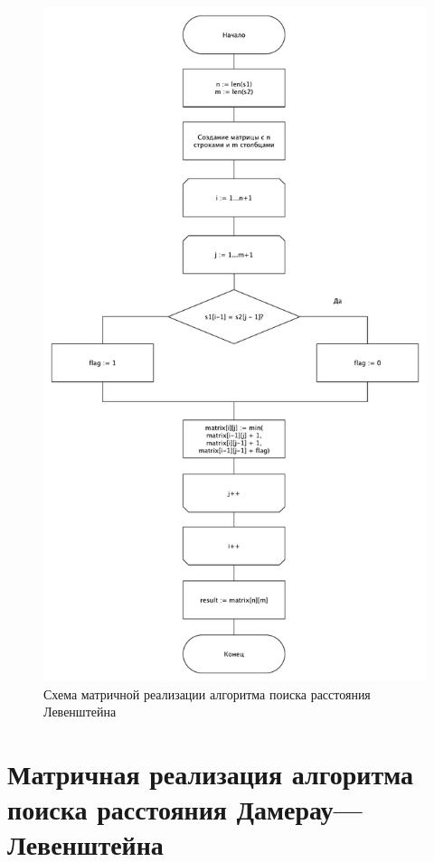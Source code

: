 \begin{figure}[H]
	\centering
	\includegraphics[scale=0.55]{assets/lev.pdf}
	\caption{Схема матричной реализации алгоритма поиска расстояния Левенштейна}
	\label{pic:lev}
\end{figure}

\newpage

\section{Матричная реализация алгоритма поиска расстояния Дамерау---Левенштейна}

